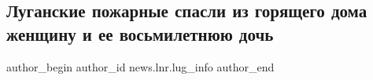  
 
 
 
 
\subsection{Луганские пожарные спасли из горящего дома женщину и ее восьмилетнюю дочь}
\label{sec:19_01_2022.stz.news.lnr.lug_info.1.spasenie_pozhar}

\ifcmt
 author_begin
   author_id news.lnr.lug_info
 author_end
\fi


